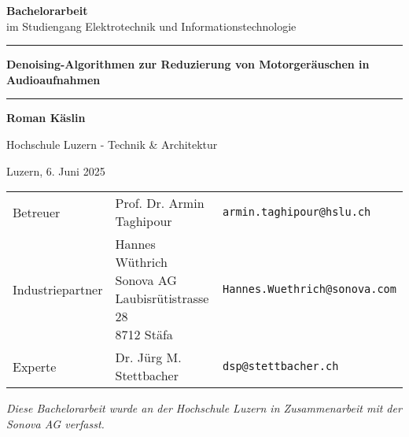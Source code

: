 \begin{titlepage}
    \centering


    {\LARGE \textbf{Bachelorarbeit}\vspace{0.3cm}\\
    im Studiengang Elektrotechnik und Informationstechnologie\par}
    
    \vspace{1.2cm}

    \rule{\textwidth}{0.5pt}
    {\LARGE\bfseries Denoising-Algorithmen zur Reduzierung von Motorgeräuschen in Audioaufnahmen\par}
    \rule{\textwidth}{0.5pt}

    \vspace{3cm}

    {\large \textbf{Roman Käslin}\par}
    \vspace{0.5cm}

    {\large Hochschule Luzern - Technik \& Architektur\par}
    \vspace{0.5cm}

    {\large Luzern, 6. Juni 2025\par}

    \vfill

    \renewcommand{\arraystretch}{1.5}
    \begin{tabular}{p{3.5cm}p{5cm}p{5.5cm}}
        \midrule
        Betreuer & Prof. Dr. Armin Taghipour & \texttt{armin.taghipour@hslu.ch} \\
        Industriepartner &
            \parbox[t]{5cm}{
                Hannes Wüthrich\\
                Sonova AG\\
                Laubisrütistrasse 28\\
                8712 Stäfa
            } & \texttt{Hannes.Wuethrich@sonova.com} \\
        Experte & Dr. Jürg M. Stettbacher & \texttt{dsp@stettbacher.ch} \\
    \end{tabular}
    \renewcommand{\arraystretch}{1.0}
    
    \vspace{1cm}

    {\normalsize \textit{Diese Bachelorarbeit wurde an der Hochschule Luzern in Zusammenarbeit mit der Sonova AG verfasst.}\par}

\end{titlepage}

